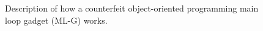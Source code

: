 % 

 \begin{figure}[!t]
   \centering
\vspace{-2.6cm}
\caption{Description of how a counterfeit object-oriented programming main loop gadget (ML-G) works.}
\label{Code example used to illustrate how a COOP loop gadget works}
\end{figure}

